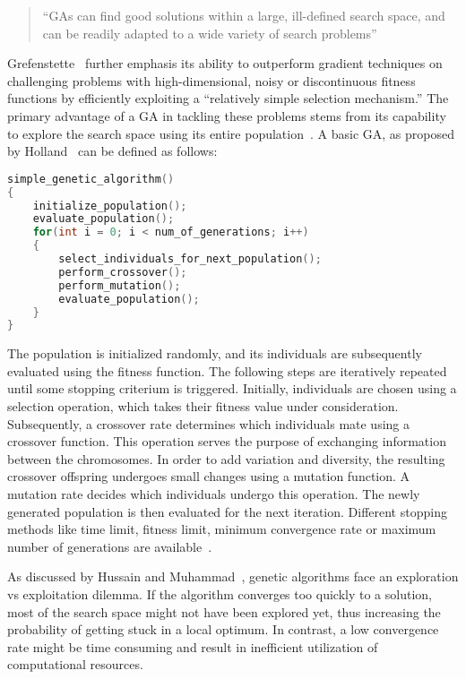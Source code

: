 \begin{quote}
	\begin{em}
		\enquote{GAs can find good solutions within a large, ill-defined search space, and can be readily adapted to a wide variety of search problems}~\cite{mills_determining_2015}
	\end{em}
\end{quote}

Grefenstette~\cite{grefenstette_optimization_1986} further emphasis its ability to outperform gradient techniques on challenging problems with high-dimensional, noisy or discontinuous fitness functions by efficiently exploiting a \enquote{relatively simple selection mechanism.} The primary advantage of a GA in tackling these problems stems from its capability to explore the search space using its entire population~\cite{hussain_trade-off_2020}. A basic GA, as proposed by Holland~\cite{holland_adaptation_1992} can be defined as follows:

\begin{lstlisting}[language=C, tabsize=4]
simple_genetic_algorithm() 
{
	initialize_population();
	evaluate_population();
	for(int i = 0; i < num_of_generations; i++) 
	{
		select_individuals_for_next_population();
		perform_crossover();
		perform_mutation();
		evaluate_population();
	}
}
\end{lstlisting}

The population is initialized randomly, and its individuals are subsequently evaluated using the fitness function. The following steps are iteratively repeated until some stopping criterium is triggered. Initially, individuals are chosen using a selection operation, which takes their fitness value under consideration. Subsequently, a crossover rate determines which individuals mate using a crossover function. This operation serves the purpose of exchanging information between the chromosomes. In order to add variation and diversity, the resulting crossover offspring undergoes small changes using a mutation function. A mutation rate decides which individuals undergo  this operation. The newly generated population is then evaluated for the next iteration. Different stopping methods like time limit, fitness limit, minimum convergence rate or maximum number of generations are available~\cite{majumdar_genetic_2015}.

As discussed by Hussain and Muhammad~\cite{hussain_trade-off_2020}, genetic algorithms face an exploration vs exploitation dilemma. If the algorithm converges too quickly to a solution, most of the search space might not have been explored yet, thus increasing the probability of getting stuck in a local optimum.
In contrast, a low convergence rate might be time consuming and result in inefficient utilization of computational resources.

